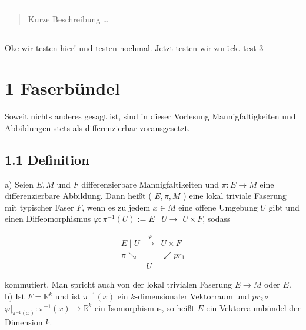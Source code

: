 \maketitle
\rule{\textwidth}{0.5pt}
\begin{abstract}
Kurze Beschreibung …
\end{abstract}
\rule{\textwidth}{0.5pt}
\vspace{0.5cm}

\tableofcontents

\pagebreak


Oke wir testen hier! und testen nochmal. Jetzt testen wir zurück. test 3



\section{1 Faserbündel}
Soweit nichts anderes gesagt ist, sind in dieser Vorlesung Mannigfaltigkeiten und Abbildungen stets als differenzierbar vorausgesetzt.

\subsection*{1.1 Definition}
a) Seien $E, M$ und $F$ differenzierbare Mannigfaltikeiten und $\pi: E \rightarrow M$ eine differenzierbare Abbildung. Dann heißt ( $E, \pi, M$ ) eine lokal triviale Faserung mit typischer Faser $F$, wenn es zu jedem $x \in M$ eine offene Umgebung $U$ gibt und einen Diffeomorphismus $\varphi: \pi^{-1}(U):=E \mid U \rightarrow$ $U \times F$, sodass

$$
\begin{array}{lll}
E \mid U & \xrightarrow{\varphi} & U \times F \\
\pi \searrow & & \swarrow p r_{1} \\
& U &
\end{array}
$$

kommutiert. Man spricht auch von der lokal trivialen Faserung $E \rightarrow M$ oder $E$.\\
b) Ist $F=\mathbb{R}^{k}$ und ist $\pi^{-1}(x)$ ein $k$-dimensionaler Vektorraum und $p r_{2} \circ$ $\left.\varphi\right|_{\pi^{-1}(x)}: \pi^{-1}(x) \rightarrow \mathbb{R}^{k}$ ein Isomorphismus, so heißt $E$ ein Vektorraumbündel der Dimension $k$.

